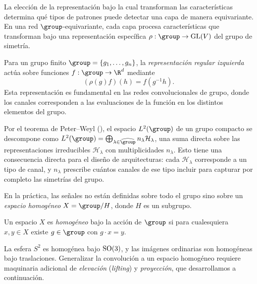 La elecci\'on de la representaci\'on bajo la cual transforman las
caracter\'isticas determina qu\'e tipos de patrones puede detectar una capa de
manera equivariante. En una red $\group$-equivariante, cada capa procesa
caracter\'isticas que transforman bajo una representaci\'on espec\'ifica $\rho:
\group \to \GL(V)$ del grupo de simetr\'ia.

\begin{example}
\label{ex:groups:regular-representation}
Para un grupo finito $\group = \{g_1, \dots, g_n\}$, la \emph{representaci\'on
regular izquierda} act\'ua sobre funciones $f: \group \to \R^d$ mediante
\begin{equation}
  (\rho(g) f)(h) = f(g^{-1} h).
\end{equation}
Esta representaci\'on es fundamental en las redes convolucionales de grupo, donde
los canales corresponden a las evaluaciones de la funci\'on en los distintos
elementos del grupo.
\end{example}

Por el teorema de Peter--Weyl (), el espacio $L^2(\group)$
de un grupo compacto se descompone como $L^2(\group) = \bigoplus_{\lambda \in
\widehat \group} n_\lambda \mathcal{H}_\lambda$, una suma directa sobre las
representaciones irreducibles $\mathcal{H}_\lambda$ con multiplicidades
$n_\lambda$. Esto tiene una consecuencia directa para el dise\~no de
arquitecturas: cada $\mathcal{H}_\lambda$ corresponde a un tipo de canal, y
$n_\lambda$ prescribe cu\'antos canales de ese tipo incluir para capturar por
completo las simetr\'ias del grupo.

En la pr\'actica, las se\~nales no est\'an definidas sobre todo el grupo sino
sobre un \emph{espacio homog\'eneo} $X = \group / H$, donde $H$ es un subgrupo.

\begin{definition}
\label{def:groups:homogeneous-space}
Un espacio $X$ es \emph{homog\'eneo} bajo la acci\'on de $\group$ si para
cualesquiera $x, y \in X$ existe $g \in \group$ con $g \cdot x = y$.
\end{definition}

La esfera $S^2$ es homog\'enea bajo $\operatorname{SO}(3)$, y las im\'agenes ordinarias son
homog\'eneas bajo traslaciones. Generalizar la convoluci\'on a un espacio
homog\'eneo requiere maquinaria adicional de \emph{elevaci\'on} (\emph{lifting})
y \emph{proyecci\'on}, que desarrollamos a continuaci\'on.

